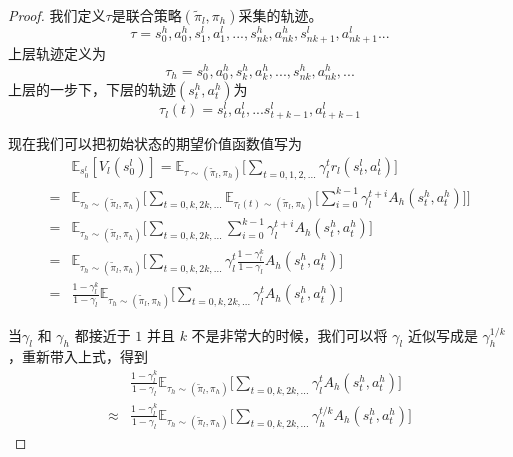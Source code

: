 \begin{proof}
我们定义$\tau$是联合策略$(\tilde\pi_l,\pi_h)$采集的轨迹。
\begin{equation*}
    \tau = s_0^h,a_0^h,s_1^l,a_1^l,...,s_{nk}^h,a_{nk}^h,s_{nk+1}^l,a^l_{nk + 1}...
\end{equation*}
上层轨迹定义为
\begin{equation*}
    \tau_h = s_0^h,a_0^h,s_k^h, a_k^h,...,s_{nk}^h,a_{nk}^h,...
\end{equation*}
上层的一步下，下层的轨迹$(s_t^h,a_t^h)$为
\begin{equation*}
    \tau_l(t) = s_{t}^l,a_{t}^l,...s_{t+k-1}^l,a_{t+k-1}^l
\end{equation*}

现在我们可以把初始状态的期望价值函数值写为
        \begin{align}
            &\mathbb{E}_{s_0^l}[V_l(s_0^l)] = \mathbb{E}_{\tau\sim(\tilde\pi_l,\pi_h)}\Bigg[\sum_{t = 0, 1, 2, ...} \gamma_l^{t} r_l(s_t^l, a_t^l)\Bigg]\\
            =&\mathbb{E}_{\tau_h\sim(\tilde\pi_l,\pi_h)}\Bigg[\sum_{t=0,k,2k,...}\mathbb{E}_{\tau_l(t)\sim(\tilde\pi_l,\pi_h)}\Big[\sum_{i = 0}^{k-1}\gamma_l^{t+i}A_h(s_t^h, a_t^h)\Big]\Bigg]\\
            =&\mathbb{E}_{\tau_h\sim(\tilde\pi_l,\pi_h)}\Bigg[\sum_{t=0,k,2k,...}\sum_{i = 0}^{k-1}\gamma_l^{t+i}A_h(s_t^h, a_t^h)\Bigg]\\
            =&\mathbb{E}_{\tau_h\sim(\tilde\pi_l,\pi_h)}\Bigg[\sum_{t=0,k,2k,...}\gamma_l^t\frac{1-\gamma_l^k}{1-\gamma_l}A_h(s_t^h, a_t^h)\Bigg]\\
            =&\frac{1-\gamma_l^k}{1-\gamma_l}\mathbb{E}_{\tau_h\sim(\tilde\pi_l,\pi_h)}\Bigg[\sum_{t=0,k,2k,...}\gamma_l^tA_h(s_t^h, a_t^h)\Bigg]
        \end{align}
    
    当$\gamma_l$ 和 $\gamma_h$ 都接近于 $1$ 并且 $k$ 不是非常大的时候，我们可以将 $\gamma_l$ 近似写成是 $\gamma_h^{1/k}$，重新带入上式，得到
    \begin{equation}
    \begin{aligned}
        &\frac{1-\gamma_l^k}{1-\gamma_l}\mathbb{E}_{\tau_h\sim(\tilde\pi_l,\pi_h)}\Bigg[\sum_{t=0,k,2k,...}\gamma_l^tA_h(s_t^h, a_t^h)\Bigg]\\
            \approx&\frac{1-\gamma_l^k}{1-\gamma_l}\mathbb{E}_{\tau_h\sim(\tilde\pi_l,\pi_h)}\Bigg[\sum_{t=0,k,2k,...}\gamma_h^{t/k}A_h(s_t^h, a_t^h)\Bigg]
    \end{aligned}
    \end{equation}
\end{proof}

